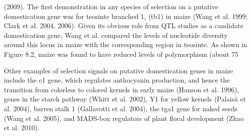 \documentclass{article}
\begin{document}
(2009). The first demonstration in any species of selection on a putative domestication gene was for teosinte branched 1, (tb1) in maize (Wang et al. 1999; Clark et al. 2004, 2006). Given its obvious role from QTL studies as a candidate domestication gene, Wang et al. compared the levels of nucleotide diversity around this locus in maize with the corresponding region in teosinte. As shown in Figure 8.2, maize was found to have reduced levels of polymorphism (about 75%

Other examples of selection signals on putative domestication genes in maize include the c1 gene, which regulates anthocyanin production, and hence the transition from colorless to colored kernels in early maize (Hanson et al. 1996), genes in the starch pathway (Whitt et al. 2002), Y1 for yellow kernels (Palaisă et al. 2004), barren stalk 1 (Gallavotti et al. 2004), the tga1 gene for naked seeds (Wang et al. 2005), and MADS-box regulators of plant floral development (Zhao et al. 2010).
\end{document}
